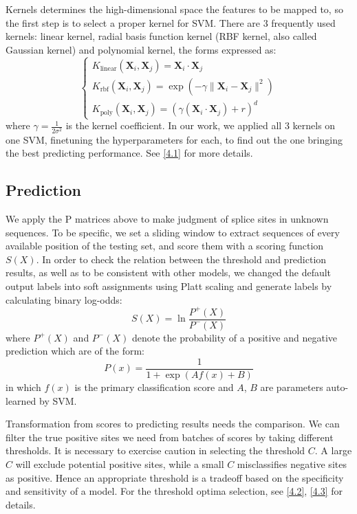 \documentclass[journal,twoside]{IEEEtran}
\begin{document}
Kernels determines the high-dimensional space the features to be mapped to, so the first step is to select a proper kernel for SVM. There are 3 frequently used kernels: linear kernel, radial basis function kernel (RBF kernel, also called Gaussian kernel) and polynomial kernel, the forms expressed as:
\begin{equation}
\begin{cases}
K_\text{linear}(\textbf{X}_i, \textbf{X}_j) = \textbf{X}_i \cdot \textbf{X}_j \\
K_\text{rbf}(\textbf{X}_i, \textbf{X}_j) = \exp(-\gamma\| \textbf{X}_i - \textbf{X}_j \|^2) \\
K_\text{poly}(\textbf{X}_i, \textbf{X}_j) = (\gamma (\textbf{X}_i \cdot \textbf{X}_j)+r)^d
\end{cases}
\label{eq3}
\end{equation}
where $\gamma = \frac{1}{2\sigma^2}$ is the kernel coefficient. In our work, we applied all 3 kernels on one SVM, finetuning the hyperparameters for each, to find out the one bringing the best predicting performance. See \ref{4.1} for more details. 

\subsection{Prediction}\label{2.5}

We apply the P matrices above to make judgment of splice sites in unknown sequences. To be specific, we set a sliding window to extract sequences of every available position of the testing set, and score them with a scoring function $S(X)$. In order to check the relation between the threshold and prediction results, as well as to be consistent with other models, we changed the default output labels into soft assignments using Platt scaling \cite{platt1999probabilistic} and generate labels by calculating binary log-odds: 
\begin{equation}
S(X) = \ln \displaystyle\frac{P^+(X)}{P^-(X)}
\label{eq4}
\end{equation}
where $P^+(X)$ and $P^-(X)$ denote the probability of a positive and negative prediction which are of the form: 
\begin{equation}
P(x) = \displaystyle\frac{1}{1+\exp{(Af(x) + B)}}
\label{eq5}
\end{equation}
in which $f(x)$ is the primary classification score and $A$, $B$ are parameters auto-learned by SVM. 

Transformation from scores to predicting results needs the comparison. We can filter the true positive sites we need from batches of scores by taking different thresholds. It is necessary to exercise caution in selecting the threshold $C$. A large $C$ will exclude potential positive sites, while a small $C$ misclassifies negative sites as positive. Hence an appropriate threshold is a tradeoff based on the specificity and sensitivity of a model. For the threshold optima selection, see \ref{4.2}, \ref{4.3} for details. 
\end{document}
